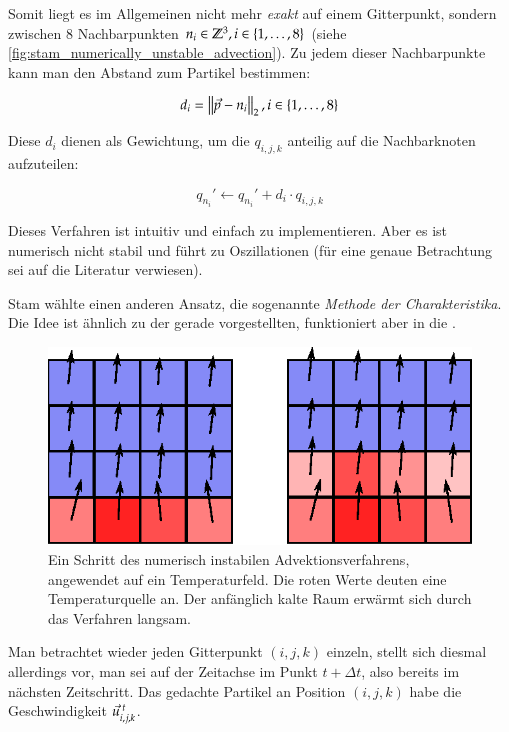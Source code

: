 Somit liegt es im Allgemeinen nicht mehr \emph{exakt} auf einem
Gitterpunkt, sondern zwischen 8 Nachbarpunkten $n_i \in
\PimiddyGanz^3, i \in \{1,\ldots,8\}$ (siehe
\autoref{fig:stam_numerically_unstable_advection}). Zu jedem dieser
Nachbarpunkte kann man den Abstand zum Partikel bestimmen:

\begin{equation}
d_i = \PimiddyNorm{2}{\vec{p} - n_i}, i \in \{1,\ldots,8\}
\end{equation}

Diese $d_i$ dienen als Gewichtung, um die  $q_{i,j,k}$
anteilig auf die Nachbarknoten aufzuteilen:

\begin{equation}
q_{n_i}' \leftarrow q_{n_i}' + d_i \cdot q_{i,j,k}
\end{equation}

Dieses Verfahren ist intuitiv und einfach zu implementieren. Aber es ist
numerisch nicht stabil und führt zu Oszillationen (für eine genaue Betrachtung
sei auf die Literatur verwiesen).

Stam wählte einen anderen Ansatz, die sogenannte \emph{Methode der
Charakteristika}. Die Idee ist ähnlich zu der gerade vorgestellten, funktioniert
aber in die .

\begin{figure}[ht]
\centering
\includegraphics[width=12cm]{images/advection_bad_example}
\caption{Ein Schritt des numerisch instabilen Advektionsverfahrens, angewendet auf ein Temperaturfeld. Die roten Werte deuten eine Temperaturquelle an. Der anfänglich kalte Raum erwärmt sich durch das Verfahren langsam.}
\end{figure}

Man betrachtet wieder jeden Gitterpunkt $(i,j,k)$ einzeln, stellt sich
diesmal allerdings vor, man sei auf der Zeitachse im Punkt $t+\Delta
t$, also bereits im nächsten Zeitschritt. Das gedachte Partikel an
Position $(i,j,k)$ habe die Geschwindigkeit
$\vec{u}_{i,j,k}^{\PimiddyFormelText{ }t}$.


